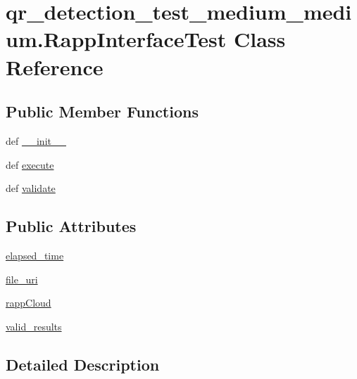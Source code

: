 \hypertarget{classqr__detection__test__medium__medium_1_1RappInterfaceTest}{\section{qr\-\_\-detection\-\_\-test\-\_\-medium\-\_\-medium.\-Rapp\-Interface\-Test Class Reference}
\label{classqr__detection__test__medium__medium_1_1RappInterfaceTest}
}
\subsection*{Public Member Functions}
\begin{DoxyCompactItemize}
\item 
def \hyperlink{classqr__detection__test__medium__medium_1_1RappInterfaceTest_a24a946445a38c1c88d681ba6710082d7}{\-\_\-\-\_\-init\-\_\-\-\_\-}
\item 
def \hyperlink{classqr__detection__test__medium__medium_1_1RappInterfaceTest_a6cb7c6b5c32824634db85be5509b03fc}{execute}
\item 
def \hyperlink{classqr__detection__test__medium__medium_1_1RappInterfaceTest_ac462ad2663c38aa2492b17a3ec2332b5}{validate}
\end{DoxyCompactItemize}
\subsection*{Public Attributes}
\begin{DoxyCompactItemize}
\item 
\hyperlink{classqr__detection__test__medium__medium_1_1RappInterfaceTest_a81bf413769089e9ecf769276571bb497}{elapsed\-\_\-time}
\item 
\hyperlink{classqr__detection__test__medium__medium_1_1RappInterfaceTest_aec04b5ce1780bb4f991c22554ab15657}{file\-\_\-uri}
\item 
\hyperlink{classqr__detection__test__medium__medium_1_1RappInterfaceTest_af8950b973ea4fd911aae75aba5f0c70e}{rapp\-Cloud}
\item 
\hyperlink{classqr__detection__test__medium__medium_1_1RappInterfaceTest_a6a60ed7cde7aa3fc6ed3d451f80b187c}{valid\-\_\-results}
\end{DoxyCompactItemize}


\subsection{Detailed Description}



